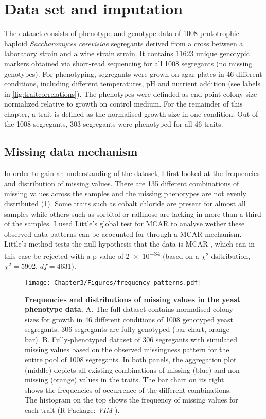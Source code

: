 \section{Data set and imputation}
The dataset consists of phenotype and genotype data of \num{1008} prototrophic haploid \emph{Saccharomyces cerevisiae} segregants derived from a cross between a laboratory strain and a wine strain strain. It contains \num{11623} unique genotypic markers obtained via short-read sequencing for all \num{1008} segregants (no missing genotypes). For phenotyping, segregants were grown on agar plates in \num{46} different conditions, including different temperatures, pH and nutrient addition (see labels in \cref{fig:traitcorrelations}). The phenotypes were definded as end-point colony size normalized relative to growth on control medium. For the remainder of this chapter, a trait is defined as the normalised growth size in one condition. Out of the \num{1008} segregants, \num{303} segregants were phenotyped for all \num{46} traits.

\subsection{Missing data mechanism} 
In order to gain an understanding of the dataset, I first looked at the frequencies and distribution of missing values. There are \num{135} different combinations of missing values across the samples and the missing phenotypes are not evenly distributed (\cref{fig:missingness}). Some traits such as cobalt chloride are present for almost all samples while others such as sorbitol or raffinose are lacking in more than a third of the samples. I used Little's global test for MCAR to analyse wether these observed data patterns can be acocunted for through a MCAR mechanism. Little's method tests the null hypothesis that the data is MCAR \citep{Little1988,Beaujean2015}, which can in this case be rejected with a p-value of \num{2e-34} (based on a \(\chi^2\) dsitribution, \(\chi^2=\)\num{5902}, \(df=\)\num{4631}). 

\begin{figure}[p]
	\centering
	\texttt{[image: Chapter3/Figures/frequency-patterns.pdf]}
	\caption[\textbf{Frequencies and distributions of missing values in the yeast phenotype data.} Generated via R function \textit{VIM::aggr}]{\textbf{Frequencies and distributions of missing values in the yeast phenotype data.} A. The full dataset contains normalised colony sizes for growth in \num{46} different conditions of \num{1008} genotyped yeast segregants. \num{306} segregants are fully genotyped (bar chart, orange bar). B. Fully-phenotyped dataset of \num{306} segregants with simulated missing values based on the observed missingness pattern for the entire pool of \num{1008} segregants. In both panels, the aggregation plot (middle) depicts all existing combinations of missing (blue) and non-missing (orange) values in the traits. The bar chart on its right shows the frequencies of occurrence of the different combinations. The histogram on the top shows the frequency of missing values for each trait (R Package: \emph{VIM} \citep{Templ2012}). }
 	\label{fig:missingness}
\end{figure}

